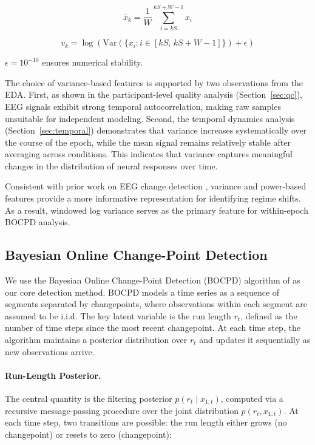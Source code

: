 \documentclass[11pt,letterpaper]{article}
\begin{document}
\[
\bar{x}_k = \frac{1}{W} \sum_{i=kS}^{kS+W-1} x_i
\]

\[
v_k = \log\left(\text{Var}\left(\{x_i : i \in [kS,\, kS+W-1]\}\right) + \epsilon\right)
\]

$\epsilon = 10^{-10}$ ensures numerical stability.

The choice of variance-based features is supported by two observations from the EDA. First, as shown in the participant-level quality analysis (Section~\ref{sec:qc}), EEG signals exhibit strong temporal autocorrelation, making raw samples unsuitable for independent modeling. Second, the temporal dynamics analysis (Section~\ref{sec:temporal}) demonstrates that variance increases systematically over the course of the epoch, while the mean signal remains relatively stable after averaging across conditions. This indicates that variance captures meaningful changes in the distribution of neural responses over time.

Consistent with prior work on EEG change detection \citep{schroeder2019fresped}, variance and power-based features provide a more informative representation for identifying regime shifts. As a result, windowed log variance serves as the primary feature for within-epoch BOCPD analysis.

\subsection{Bayesian Online Change-Point Detection}

We use the Bayesian Online Change-Point Detection (BOCPD) algorithm of \citet{adams2007bocpd} as our core detection method. BOCPD models a time series as a sequence of segments separated by changepoints, where observations within each segment are assumed to be i.i.d. The key latent variable is the run length $r_t$, defined as the number of time steps since the most recent changepoint. At each time step, the algorithm maintains a posterior distribution over $r_t$ and updates it sequentially as new observations arrive.

\paragraph{Run-Length Posterior.}
The central quantity is the filtering posterior $p(r_t \mid x_{1:t})$, computed via a recursive message-passing procedure over the joint distribution $p(r_t, x_{1:t})$. At each time step, two transitions are possible: the run length either grows (no changepoint) or resets to zero (changepoint):
\end{document}
